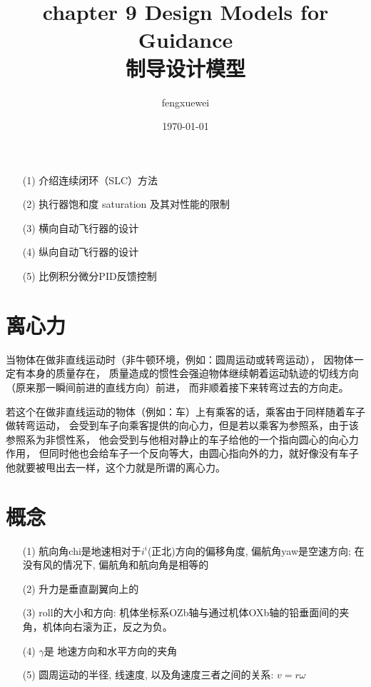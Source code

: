 \documentclass[UTF8,a4paper,10pt,nocolorlinks]{ctexart}
\title{
    \textbf{chapter 9 Design Models for Guidance }\\
    \textbf{制导设计模型}
}
\author{ fengxuewei }
\date{\today}
\begin{document}
    \maketitle
    
    \begin{itemize}
        \item[(1)] 介绍连续闭环（SLC）方法
        \item[(2)] 执行器饱和度 saturation 及其对性能的限制
        \item[(3)] 横向自动飞行器的设计
        \item[(4)] 纵向自动飞行器的设计
        \item[(5)] 比例积分微分PID反馈控制
    \end{itemize}
    \clearpage
    \section{离心力}
    当物体在做非直线运动时（非牛顿环境，例如：圆周运动或转弯运动），
    因物体一定有本身的质量存在，
    质量造成的惯性会强迫物体继续朝着运动轨迹的切线方向（原来那一瞬间前进的直线方向）前进，
    而非顺着接下来转弯过去的方向走。
    \par 若这个在做非直线运动的物体（例如：车）上有乘客的话，乘客由于同样随着车子做转弯运动，
    会受到车子向乘客提供的向心力，但是若以乘客为参照系，由于该参照系为非惯性系，
    他会受到与他相对静止的车子给他的一个指向圆心的向心力作用，
    但同时他也会给车子一个反向等大，由圆心指向外的力，就好像没有车子他就要被甩出去一样，这个力就是所谓的离心力。
    \section{概念}
    \begin{itemize}
        \item[(1)] 
        航向角chi是地速相对于$i^{i}$(正北)方向的偏移角度, 偏航角yaw是空速方向; 在没有风的情况下, 偏航角和航向角是相等的
        \item[(2)] 升力是垂直副翼向上的
        \item[] 
        \item[(3)] roll的大小和方向: 机体坐标系OZb轴与通过机体OXb轴的铅垂面间的夹角，机体向右滚为正，反之为负。
        \item[(4)] $\gamma$是 地速方向和水平方向的夹角
        \item[(5)] 圆周运动的半径, 线速度, 以及角速度三者之间的关系: $v = r \omega$
    \end{itemize}
    \setcounter{page}{1}        %
\end{document}
